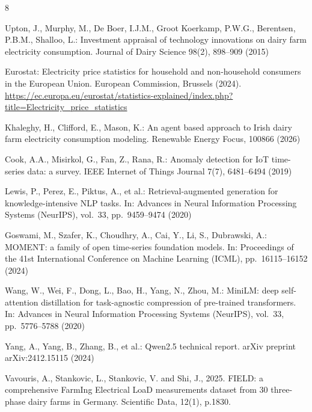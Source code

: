 \documentclass[runningheads]{llncs}
\begin{document}
\begin{thebibliography}{8}

Upton, J., Murphy, M., De Boer, I.J.M., Groot Koerkamp, P.W.G., Berentsen,
P.B.M., Shalloo, L.: Investment appraisal of technology innovations on dairy
farm electricity consumption. Journal of Dairy Science 98(2), 898--909 (2015)

Eurostat: Electricity price statistics for household and non-household
consumers in the European Union. European Commission, Brussels (2024).
\url{https://ec.europa.eu/eurostat/statistics-explained/index.php?title=Electricity_price_statistics}

Khaleghy, H., Clifford, E., Mason, K.: An agent based approach to Irish dairy
farm electricity consumption modeling. Renewable Energy Focus, 100866 (2026)

Cook, A.A., Misirkol, G., Fan, Z., Rana, R.: Anomaly detection for IoT
time-series data: a survey. IEEE Internet of Things Journal 7(7),
6481--6494 (2019)

Lewis, P., Perez, E., Piktus, A., et al.: Retrieval-augmented generation for
knowledge-intensive NLP tasks. In: Advances in Neural Information Processing
Systems (NeurIPS), vol.~33, pp.~9459--9474 (2020)

Goswami, M., Szafer, K., Choudhry, A., Cai, Y., Li, S., Dubrawski, A.:
MOMENT: a family of open time-series foundation models. In: Proceedings of
the 41st International Conference on Machine Learning (ICML),
pp.~16115--16152 (2024)

Wang, W., Wei, F., Dong, L., Bao, H., Yang, N., Zhou, M.: MiniLM: deep
self-attention distillation for task-agnostic compression of pre-trained
transformers. In: Advances in Neural Information Processing Systems (NeurIPS),
vol.~33, pp.~5776--5788 (2020)

Yang, A., Yang, B., Zhang, B., et al.: Qwen2.5 technical report.
arXiv preprint arXiv:2412.15115 (2024)

Vavouris, A., Stankovic, L., Stankovic, V. and Shi, J., 2025. FIELD: a comprehensive FarmIng Electrical LoaD measurements dataset from 30 three-phase dairy farms in Germany. Scientific Data, 12(1), p.1830.

\end{thebibliography}
\end{document}
